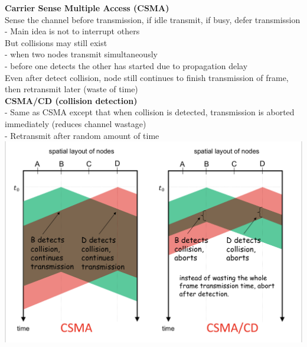 \documentclass[10pt, a4paper]{article}
\newcommand{\blue}[1]{{\color{MidnightBlue}#1}}
\newcommand{\red}[1]{{\color{red}#1}}
\newcommand{\green}[1]{{\color{ForestGreen}#1}}
\begin{document}
\begin{multicols*}{3}
		\textbf{Carrier Sense Multiple Access (CSMA)}\\
		Sense the channel before transmission, if \green{idle} transmit, if \red{busy}, defer transmission\\
		- Main idea is not to interrupt others\\
		But \red{collisions} may still exist\\
		- when two nodes transmit simultaneously\\
		- before one detects the other has started due to propagation delay\\
		Even after detect collision, node still continues to finish transmission of frame, then retransmit later (waste of time)\\

		\textbf{CSMA/CD (collision detection)}\\
		- Same as CSMA except that when collision is detected, transmission is \blue{aborted immediately} (reduces channel wastage)\\
		- Retransmit after \blue{random} amount of time\\
		\includegraphics[scale=.13]{./assets/CSMA}\\


\end{multicols*}
\end{document}
